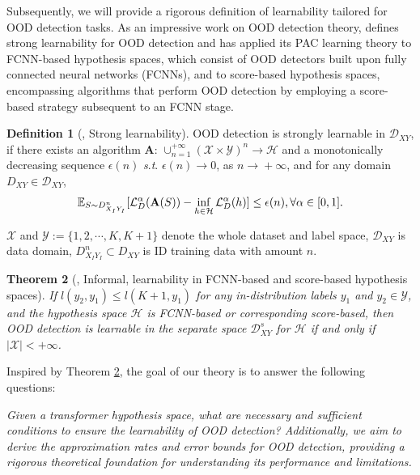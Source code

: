\documentclass{article}
\theoremstyle{plain}
\newtheorem{theorem}{Theorem}[section]
\theoremstyle{definition}
\newtheorem{definition}[theorem]{Definition}
\theoremstyle{remark}
\begin{document}
Subsequently, we will provide a rigorous definition of learnability tailored for OOD detection tasks.
As an impressive work on OOD detection theory, \citet{fang2022out} defines strong learnability for OOD detection and has applied its PAC learning theory to FCNN-based hypothesis spaces, which consist of OOD detectors built upon fully connected neural networks (FCNNs), and to score-based hypothesis spaces, encompassing algorithms that perform OOD detection by employing a score-based strategy subsequent to an FCNN stage.

\begin{definition}[\citet{fang2022out}, Strong learnability]
     OOD detection is strongly learnable in $\mathcal{D}_{XY}$, if there exists an algorithm $\mathbf{A}$:
     $\cup_{n=1}^{+\infty}(\mathcal{X}\times \mathcal{Y})^n\xrightarrow{}\mathcal{H}$ and a monotonically decreasing sequence $\epsilon(n)$ \textit{s}.\textit{t}. $\epsilon(n)\xrightarrow{}0$, as $n\xrightarrow{}+\infty$, and for any domain $D_{XY}\in \mathcal{D}_{XY}$,
     \begin{equation}
     \small
         \mathbb{E}_{S\sim D^n_{X_IY_I}}[\mathcal{L}^{\alpha}_D(\mathbf{A}(S))-\inf_{h\in \mathcal{H}}\mathcal{L}_D^{\alpha}(h)]\leq \epsilon(n), \forall \alpha \in [0,1].
     \end{equation}
     
\end{definition}
$\mathcal{X}$ and $\mathcal{Y}:=\{1,2,\cdots, K, K+1\}$ denote the whole dataset and label space, $\mathcal{D}_{XY}$ is data domain, $D^n_{X_IY_I}\subset D_{XY}$ is ID training data with amount $n$.

\begin{theorem}[\citet{fang2022out}, Informal, learnability in FCNN-based and score-based hypothesis spaces]


If $l(y_2, y_1)\leq l(K+1, y_1)$ for any in-distribution labels $y_1$ and $y_2\in \mathcal{Y}$, and the hypothesis space $\mathcal{H}$ is FCNN-based or corresponding score-based, then OOD detection is learnable in the separate space $\mathcal{D}^s_{XY}$ for $\mathcal{H}$ if and only if $|\mathcal{X}|<+\infty$.
\label{thm1}
\end{theorem}

Inspired by Theorem \ref{thm1}, the goal of our theory is to answer the following questions:
\begin{center} 
  \parbox{0.95\columnwidth}{%
      \emph{Given a transformer hypothesis space, what are necessary and sufficient conditions to ensure the learnability of OOD detection? Additionally, we aim to derive the approximation rates and error bounds for OOD detection, providing a rigorous theoretical foundation for understanding its performance and limitations.}    
}  
\end{center}  
\end{document}
